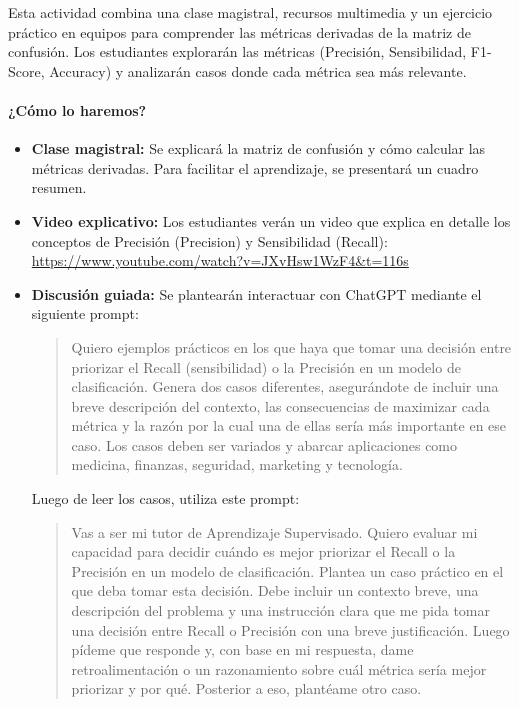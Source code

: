 \documentclass[a4,11pt]{aleph-notas}
\begin{document}
Esta actividad combina una clase magistral, recursos multimedia y un ejercicio práctico en equipos para comprender las métricas derivadas de la matriz de confusión. Los estudiantes explorarán las métricas (Precisión, Sensibilidad, F1-Score, Accuracy) y analizarán casos donde cada métrica sea más relevante.

\paragraph{¿Cómo lo haremos?}  
\begin{itemize}[leftmargin=*]
    \item \textbf{Clase magistral:}  
    Se explicará la matriz de confusión y cómo calcular las métricas derivadas. Para facilitar el aprendizaje, se presentará un cuadro resumen.

    \item \textbf{Video explicativo:}  
    Los estudiantes verán un video que explica en detalle los conceptos de Precisión (Precision) y Sensibilidad (Recall): \url{https://www.youtube.com/watch?v=JXvHsw1WzF4&t=116s}

    \item \textbf{Discusión guiada:}  
    Se plantearán interactuar con ChatGPT mediante el siguiente prompt:
    \begin{quote}\small
        Quiero ejemplos prácticos en los que haya que tomar una decisión entre priorizar el Recall (sensibilidad) o la Precisión en un modelo de clasificación. Genera dos casos diferentes, asegurándote de incluir una breve descripción del contexto, las consecuencias de maximizar cada métrica y la razón por la cual una de ellas sería más importante en ese caso. Los casos deben ser variados y abarcar aplicaciones como medicina, finanzas, seguridad, marketing y tecnología.
    \end{quote}
    Luego de leer los casos, utiliza este prompt:
    \begin{quote}\small
        Vas a ser mi tutor de Aprendizaje Supervisado. Quiero evaluar mi capacidad para decidir cuándo es mejor priorizar el Recall o la Precisión en un modelo de clasificación. Plantea un caso práctico en el que deba tomar esta decisión. Debe incluir un contexto breve, una descripción del problema y una instrucción clara que me pida tomar una decisión entre Recall o Precisión con una breve justificación. Luego pídeme que responde y, con base en mi respuesta, dame retroalimentación o un razonamiento sobre cuál métrica sería mejor priorizar y por qué. Posterior a eso, plantéame otro caso.
    \end{quote}


\end{itemize}
\end{document}
